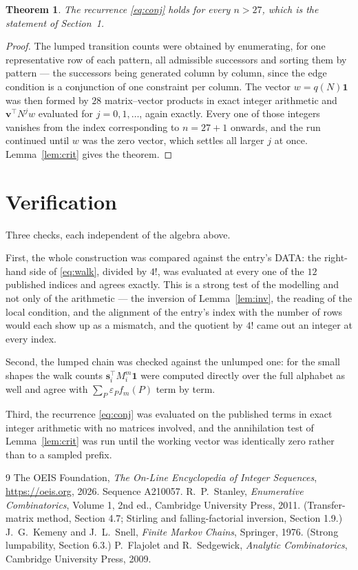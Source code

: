 \documentclass[11pt,a4paper]{article}
\theoremstyle{plain}
\newtheorem{theorem}{Theorem}
\theoremstyle{definition}
\begin{document}
\begin{theorem}
The recurrence \eqref{eq:conj} holds for every $n>27$, which is the statement of
Section~1.
\end{theorem}

\begin{proof}
The lumped transition counts were obtained by enumerating, for one representative row of
each pattern, all admissible successors and sorting them by pattern --- the successors being
generated column by column, since the edge condition is a conjunction of one constraint per
column. The vector $w=q(N)\mathbf{1}$ was then formed by $28$ matrix--vector products
in exact integer arithmetic and $\mathbf{v}^{\!\top}N^{j}w$ evaluated for
$j=0,1,\dots$, again exactly. Every one of those integers vanishes from the index
corresponding to $n=27+1$ onwards, and the run continued until $w$ was the zero vector,
which settles all larger $j$ at once. Lemma~\ref{lem:crit} gives the theorem.
\end{proof}

\section{Verification}

Three checks, each independent of the algebra above.

First, the whole construction was compared against the entry's DATA: the right-hand side of
\eqref{eq:walk}, divided by $4!$, was evaluated at every one of the $12$
published indices and agrees exactly. This is a strong test of the modelling and not only of
the arithmetic --- the inversion of Lemma~\ref{lem:inv}, the reading of the local
condition, and the alignment of the entry's index with the number of rows would each
show up as a mismatch, and the quotient by $4!$ came out an integer at every index.

Second, the lumped chain was checked against the unlumped one: for the small shapes the walk
counts $\mathbf{s}_i^{\!\top}M_i^{m}\mathbf{1}$ were computed directly over the full
alphabet as well and agree with $\sum_P\varepsilon_Pf_m(P)$ term by term.

Third, the recurrence \eqref{eq:conj} was evaluated on the published terms in exact integer
arithmetic with no matrices involved, and the annihilation test of Lemma~\ref{lem:crit} was
run until the working vector was identically zero rather than to a sampled prefix.

\begin{thebibliography}{9}
 The OEIS Foundation, \emph{The On-Line Encyclopedia of Integer
Sequences}, \url{https://oeis.org}, 2026. Sequence A210057.
 R.~P.~Stanley, \emph{Enumerative Combinatorics}, Volume 1, 2nd ed.,
Cambridge University Press, 2011. (Transfer-matrix method, Section 4.7; Stirling and
falling-factorial inversion, Section 1.9.)
 J.~G.~Kemeny and J.~L.~Snell, \emph{Finite Markov Chains}, Springer,
1976. (Strong lumpability, Section 6.3.)
 P.~Flajolet and R.~Sedgewick, \emph{Analytic Combinatorics}, Cambridge
University Press, 2009.
\end{thebibliography}
\end{document}
